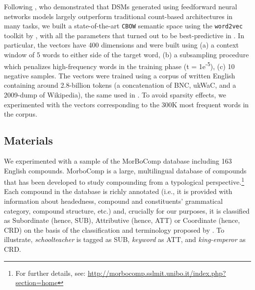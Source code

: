 \documentclass[output=paper]{langsci/langscibook}
\begin{document}
Following \cite{baronipredict}, who demonstrated that DSMs generated using feedforward neural networks models largely outperform traditional count-based architectures in many tasks, we built a state-of-the-art \texttt{CBOW} semantic space using the \texttt{word2vec} toolkit by \cite{mikolov2013}, with all the parameters that turned out to be best-predictive in \cite{baronipredict}. In particular, the vectors have 400 dimensions and were built using (a) a context window of 5 words to either side of the target word, (b) a subsampling procedure which penalizes high-frequency words in the training phase (t = 1e\textsuperscript{-5}), (c) 10 negative samples. The vectors were trained using a corpus of written English containing around 2.8-billion tokens (a concatenation of BNC, ukWaC, and a 2009-dump of Wikipedia), the same used in \cite{baronipredict}. To avoid sparsity effects, we experimented with the vectors corresponding to the 300K most frequent words in the corpus.


\subsection{Materials}

We experimented with a sample of the MorBoComp database including 163 English compounds. MorboComp is a large, multilingual database of compounds that has been developed to study compounding from a typological perspective.\footnote{For further details, see: \url{http://morbocomp.sslmit.unibo.it/index.php?section=home}} Each compound in the database is richly annotated (i.e., it is provided with information about headedness, compound and constituents' grammatical category, compound structure, etc.) and, crucially for our purposes, it is classified as Subordinate (hence, SUB), Attributive (hence, ATT) or Coordinate (hence, CRD) on the basis of the classification and terminology proposed by \cite{SB2005}. To illustrate, \emph{schoolteacher} is tagged as SUB, \emph{keyword} as ATT, and \emph{king-emperor} as CRD.
\end{document}

